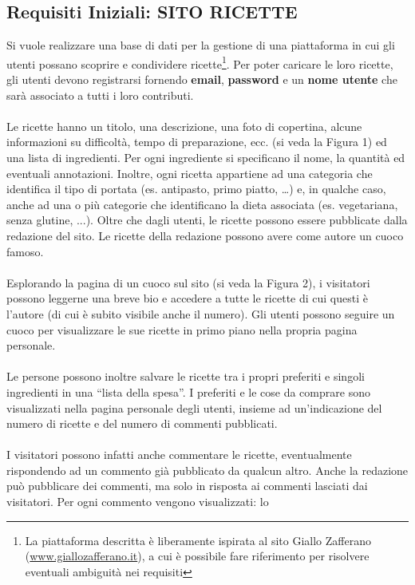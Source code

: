 \documentclass[12pt]{extarticle}
\begin{document}
\subsection{Requisiti Iniziali: SITO RICETTE}
Si vuole realizzare una base di dati per la gestione di una piattaforma in cui gli utenti possano
scoprire e condividere ricette\footnote{La piattaforma descritta è liberamente ispirata al sito Giallo Zafferano 
(\url{www.giallozafferano.it}), a cui è possibile fare riferimento per risolvere eventuali ambiguità nei requisiti}.
Per poter caricare le loro ricette, gli utenti devono registrarsi
fornendo \textbf{email}, \textbf{password} e un \textbf{nome utente} che sarà associato a tutti i loro contributi.
\\\\
Le ricette hanno un titolo, una descrizione, una foto di copertina, alcune informazioni su difficoltà,
tempo di preparazione, ecc. (si veda la Figura 1) ed una lista di ingredienti. Per ogni ingrediente si
specificano il nome, la quantità ed eventuali annotazioni. Inoltre, ogni ricetta appartiene ad una
categoria che identifica il tipo di portata (es. antipasto, primo piatto, …) e, in qualche caso, anche
ad una o più categorie che identificano la dieta associata (es. vegetariana, senza glutine, ...). Oltre
che dagli utenti, le ricette possono essere pubblicate dalla redazione del sito. Le ricette della
redazione possono avere come autore un cuoco famoso.
\\\\
Esplorando la pagina di un cuoco sul sito (si veda la Figura 2), i visitatori possono leggerne una
breve bio e accedere a tutte le ricette di cui questi è l’autore (di cui è subito visibile anche il
numero). Gli utenti possono seguire un cuoco per visualizzare le sue ricette in primo piano nella
propria pagina personale.
\\\\
Le persone possono inoltre salvare le ricette tra i propri preferiti e singoli ingredienti in una “lista
della spesa”. I preferiti e le cose da comprare sono visualizzati nella pagina personale degli utenti,
insieme ad un’indicazione del numero di ricette e del numero di commenti pubblicati.
\\\\
I visitatori possono infatti anche commentare le ricette, eventualmente rispondendo ad un
commento già pubblicato da qualcun altro. Anche la redazione può pubblicare dei commenti, ma
solo in risposta ai commenti lasciati dai visitatori. Per ogni commento vengono visualizzati: lo
\end{document}
